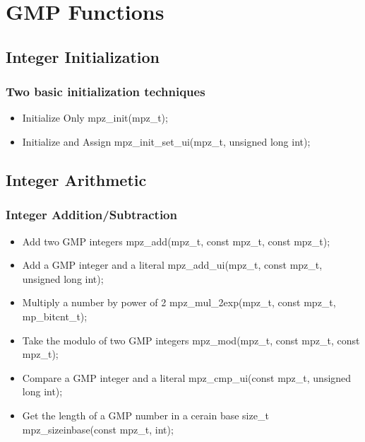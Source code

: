 \section{GMP Functions}


\subsection{Integer Initialization}

\begin{frame}
\frametitle{Two basic initialization techniques}
  \begin{itemize}
    \item Initialize Only\break
    mpz\_init(mpz\_t);
    \item Initialize and Assign\break
    mpz\_init\_set\_ui(mpz\_t, unsigned long int);
  \end{itemize}
\end{frame}


\subsection{Integer Arithmetic}

\begin{frame}
\frametitle{Integer Addition/Subtraction}
  \begin{itemize}
    \item Add two GMP integers\break
    mpz\_add(mpz\_t, const mpz\_t, const mpz\_t);
    \item Add a GMP integer and a literal\break
    mpz\_add\_ui(mpz\_t, const mpz\_t, unsigned long int);
    \item Multiply a number by power of 2\break
    mpz\_mul\_2exp(mpz\_t, const mpz\_t, mp\_bitcnt\_t);
    \item Take the modulo of two GMP integers\break
    mpz\_mod(mpz\_t, const mpz\_t, const mpz\_t);
    \item Compare a GMP integer and a literal\break
    mpz\_cmp\_ui(const mpz\_t, unsigned long int);
    \item Get the length of a GMP number in a cerain base\break
    size\_t mpz\_sizeinbase(const mpz\_t, int);
  \end{itemize}
\end{frame}


